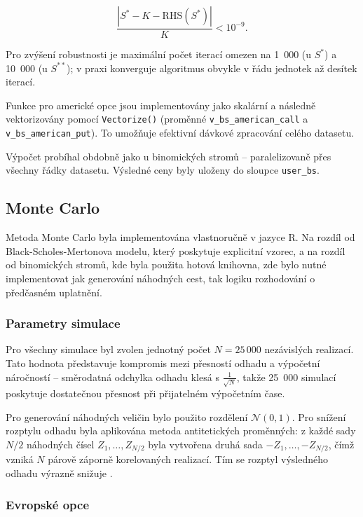 \[
\frac{|S^* - K - \text{RHS}(S^*)|}{K} < 10^{-9}.
\]

Pro zvýšení robustnosti je maximální počet iterací omezen na 1~000 (u \(S^*\)) a 10~000 (u \(S^{**}\)); v praxi konverguje algoritmus obvykle v řádu jednotek až desítek iterací.

Funkce pro americké opce jsou implementovány jako skalární a následně vektorizovány pomocí \texttt{Vectorize()} (proměnné \texttt{v\_bs\_american\_call} a \texttt{v\_bs\_american\_put}). To umožňuje efektivní dávkové zpracování celého datasetu.

Výpočet probíhal obdobně jako u binomických stromů – paralelizovaně přes všechny řádky datasetu. Výsledné ceny byly uloženy do sloupce \texttt{user\_bs}.

\subsection{Monte Carlo}

Metoda Monte Carlo byla implementována vlastnoručně v jazyce R. Na rozdíl od Black-Scholes-Mertonova modelu, který poskytuje explicitní vzorec, a na rozdíl od binomických stromů, kde byla použita hotová knihovna, zde bylo nutné implementovat jak generování náhodných cest, tak logiku rozhodování o předčasném uplatnění.

\subsubsection{Parametry simulace}

Pro všechny simulace byl zvolen jednotný počet \(N = 25\,000\) nezávislých realizací. Tato hodnota představuje kompromis mezi přesností odhadu a výpočetní náročností – směrodatná odchylka odhadu klesá s \(\frac{1}{\sqrt{N}}\), takže 25~000 simulací poskytuje dostatečnou přesnost při přijatelném výpočetním čase.

Pro generování náhodných veličin bylo použito rozdělení \(\mathcal{N}(0,1)\). Pro snížení rozptylu odhadu byla aplikována metoda antitetických proměnných: z každé sady \(N/2\) náhodných čísel \(Z_1, \dots, Z_{N/2}\) byla vytvořena druhá sada \(-Z_1, \dots, -Z_{N/2}\), čímž vzniká \(N\) párově záporně korelovaných realizací. Tím se rozptyl výsledného odhadu výrazně snižuje \citep[Kapitola~4.2]{Glasserman2004}.

\subsubsection{Evropské opce}

